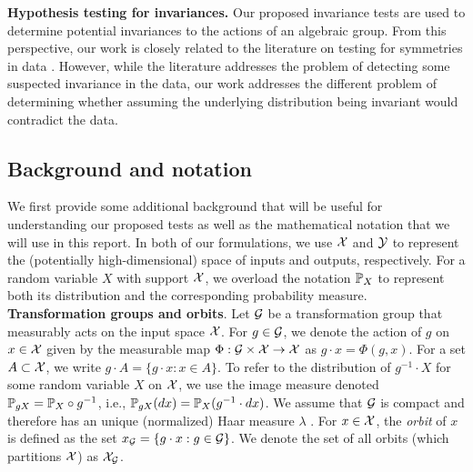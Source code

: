 \textbf{Hypothesis testing for invariances.}
Our proposed invariance tests are used to determine potential invariances to the actions of an algebraic group. From this perspective, our work is closely related to the literature on testing for symmetries in data \parencite{Henze:2003,NgatchouWandji:2009,Partlett:2015}. However, while the literature addresses the problem of detecting some suspected invariance in the data, our work addresses the different problem of determining whether assuming the underlying distribution being invariant would contradict the data.

\subsection{Background and notation} \label{sec:background}

We first provide some additional background that will be useful for understanding our proposed tests as well as the mathematical notation that we will use in this report. In both of our formulations, we use $\calX$ and $\calY$ to represent the (potentially high-dimensional) space of inputs and outputs, respectively. For a random variable $X$ with support $\calX$, we overload the notation $\P_X$ to represent both its distribution and the corresponding probability measure.
\\

\textbf{Transformation groups and orbits}. Let $\calG$ be a transformation group that measurably acts on the input space $\calX$. For $g\in\calG$, we denote the action of $g$ on $x\in\calX$ given by the measurable map $\Phi:\calG\times\calX\rightarrow\calX$ as $g\cdot x = \Phi(g,x)$. For a set $A\subset\calX$, we write $g\cdot A=\{g\cdot x: x\in A\}$. To refer to the distribution of $g^{-1}\cdot X$ for some random variable $X$ on $\calX$, we use the image measure denoted $\P_{gX}=\P_X\circ g^{-1}$, i.e., $\P_{gX}(dx)=\P_X(g^{-1}\cdot dx)$. We assume that $\calG$ is compact and therefore has an unique (normalized) Haar measure $\lambda$ \parencite[Theorem~2.10]{Folland:2016}. For $x\in\calX$, the \textit{orbit} of $x$ is defined as the set $x_\calG=\{g\cdot x:g\in\calG\}$. We denote the set of all orbits (which partitions $\calX$) as $\calX_\calG$.
\\

